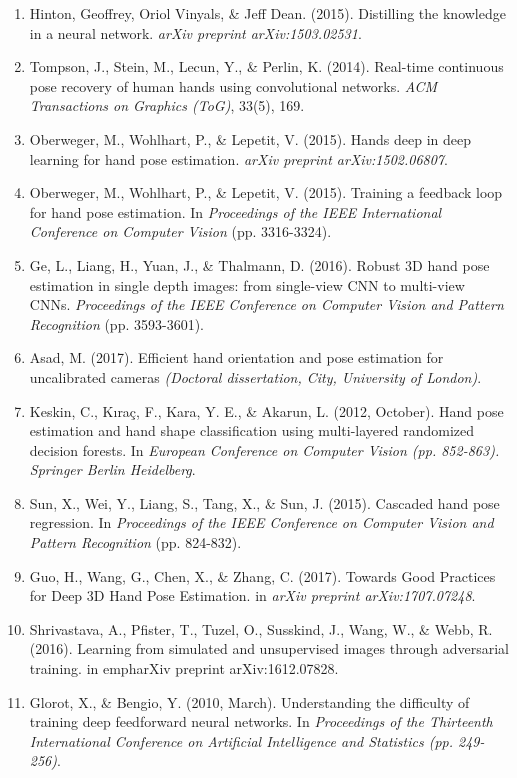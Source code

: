 \documentclass{article}
\begin{document}
{\begin{enumerate}
quantization and huffman coding. \emph{arxiv:1510.00149v3, 2015a}.
\item Hinton, Geoffrey, Oriol Vinyals, \& Jeff Dean.  (2015). Distilling the knowledge in a neural network. \emph{arXiv preprint arXiv:1503.02531}.
\item Tompson, J., Stein, M., Lecun, Y., \& Perlin, K. (2014). Real-time continuous pose recovery of human hands using convolutional networks. \emph{ACM Transactions on Graphics (ToG)}, 33(5), 169.
\item Oberweger, M., Wohlhart, P., \& Lepetit, V. (2015). Hands deep in deep learning for hand pose estimation. \emph{arXiv preprint arXiv:1502.06807}.
\item Oberweger, M., Wohlhart, P., \& Lepetit, V. (2015). Training a feedback loop for hand pose estimation. In \emph{Proceedings of the IEEE International Conference on Computer Vision} (pp. 3316-3324).
\item Ge, L., Liang, H., Yuan, J., \& Thalmann, D. (2016). Robust 3D hand pose estimation in single depth images: from single-view CNN to multi-view CNNs. \emph{Proceedings of the IEEE Conference on Computer Vision and Pattern Recognition} (pp. 3593-3601).
\item Asad, M. (2017). Efficient hand orientation and pose estimation for uncalibrated cameras \emph{(Doctoral dissertation, City, University of London)}.
\item Keskin, C., Kıraç, F., Kara, Y. E., \& Akarun, L. (2012, October). Hand pose estimation and hand shape classification using multi-layered randomized decision forests. In \emph{European Conference on Computer Vision (pp. 852-863). Springer Berlin Heidelberg}.
\item Sun, X., Wei, Y., Liang, S., Tang, X., \& Sun, J. (2015). Cascaded hand pose regression. In \emph{Proceedings of the IEEE Conference on Computer Vision and Pattern Recognition} (pp. 824-832).
\item Guo, H., Wang, G., Chen, X., \& Zhang, C. (2017). Towards Good Practices for Deep 3D Hand Pose Estimation. in \emph{arXiv preprint arXiv:1707.07248}.
\item Shrivastava, A., Pfister, T., Tuzel, O., Susskind, J., Wang, W., \& Webb, R. (2016). Learning from simulated and unsupervised images through adversarial training. in emph{arXiv preprint arXiv:1612.07828}.
\item Glorot, X., \& Bengio, Y. (2010, March). Understanding the difficulty of training deep feedforward neural networks. In \emph{ Proceedings of the Thirteenth International Conference on Artificial Intelligence and Statistics (pp. 249-256)}.

\end{enumerate}}
\end{document}
